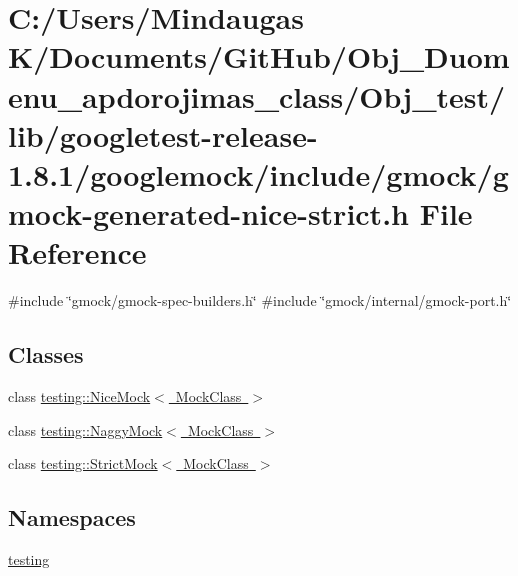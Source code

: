 \hypertarget{gmock-generated-nice-strict_8h}{}\section{C\+:/\+Users/\+Mindaugas K/\+Documents/\+Git\+Hub/\+Obj\+\_\+\+Duomenu\+\_\+apdorojimas\+\_\+class/\+Obj\+\_\+test/lib/googletest-\/release-\/1.8.1/googlemock/include/gmock/gmock-\/generated-\/nice-\/strict.h File Reference}
\label{gmock-generated-nice-strict_8h}
{\ttfamily \#include \char`\"{}gmock/gmock-\/spec-\/builders.\+h\char`\"{}}\newline
{\ttfamily \#include \char`\"{}gmock/internal/gmock-\/port.\+h\char`\"{}}\newline
\subsection*{Classes}
\begin{DoxyCompactItemize}
\item 
class \mbox{\hyperlink{classtesting_1_1_nice_mock}{testing\+::\+Nice\+Mock$<$ Mock\+Class $>$}}
\item 
class \mbox{\hyperlink{classtesting_1_1_naggy_mock}{testing\+::\+Naggy\+Mock$<$ Mock\+Class $>$}}
\item 
class \mbox{\hyperlink{classtesting_1_1_strict_mock}{testing\+::\+Strict\+Mock$<$ Mock\+Class $>$}}
\end{DoxyCompactItemize}
\subsection*{Namespaces}
\begin{DoxyCompactItemize}
\item 
 \mbox{\hyperlink{namespacetesting}{testing}}
\end{DoxyCompactItemize}
